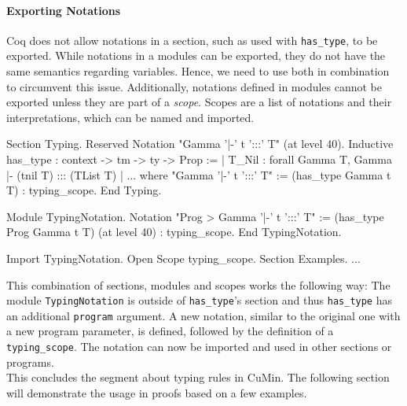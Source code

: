 \documentclass[paper = a4, fleqn, abstract=on, twoside]{scrreprt}
\newcommand{\coqinline}[1]{\texttt{#1}}
\begin{document}
\paragraph{Exporting Notations}
Coq does not allow notations in a section, such as used with \coqinline{has_type}, to be exported. While notations in a modules can be exported, they do not have the same semantics regarding variables. Hence, we need to use both in combination to circumvent this issue. Additionally, notations defined in modules cannot be exported unless they are part of a \textit{scope}. Scopes are a list of notations and their interpretations, which can be named and imported.
\begin{coqcode}
Section Typing.
  Reserved Notation "Gamma '|-' t ':::' T" (at level 40).
  Inductive has_type : context -> tm -> ty -> Prop :=
    | T_Nil : forall Gamma T, Gamma |- (tnil T) ::: (TList T)
    | ...
  where "Gamma '|-' t ':::' T" := (has_type Gamma t T) : typing_scope.
End Typing.

Module TypingNotation.
  Notation "Prog > Gamma '|-' t ':::' T" := (has_type Prog Gamma t T)
    (at level 40) : typing_scope.
End TypingNotation.

Import TypingNotation. Open Scope typing_scope.
Section Examples. ...
\end{coqcode}
This combination of sections, modules and scopes works the following way: The module \texttt{TypingNotation} is outside of \coqinline{has_type}'s section and thus \coqinline{has_type} has an additional \coqinline{program} argument. A new notation, similar to the original one with a new program parameter, is defined, followed by the definition of a \coqinline{typing_scope}.
The notation can now be imported and used in other sections or programs. \\
This concludes the segment about typing rules in CuMin. The following section will demonstrate the usage in proofs based on a few examples.
\end{document}

